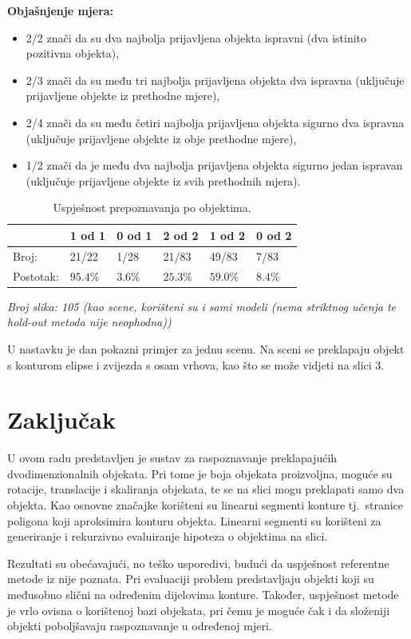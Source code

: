 \documentclass[lmodern, utf8, seminar, numeric]{fer}
\begin{document}
\textbf{Objašnjenje mjera:}
\begin{itemize}
    \item 2/2 znači da su dva najbolja prijavljena objekta ispravni (dva istinito pozitivna objekta),
    \item 2/3 znači da su među tri najbolja prijavljena objekta dva ispravna (uključuje prijavljene objekte iz prethodne mjere),
    \item 2/4 znači da su među četiri najbolja prijavljena objekta sigurno dva ispravna (uključuje prijavljene objekte iz obje prethodne mjere),
    \item 1/2 znači da je među dva najbolja prijavljena objekta sigurno jedan ispravan (uključuje prijavljene objekte iz svih prethodnih mjera).
\end{itemize}

\begin{table}[htb]
\centering
\caption{Uspješnost prepoznavanja po objektima.}
\label{tbl:po-obj}
\begin{tabular}{l l l l l l}
\toprule
 & 1 od 1 & 0 od 1 & 2 od 2 & 1 od 2 & 0 od 2\\
\midrule
Broj: & 21/22 & 1/28 & 21/83 & 49/83 & 7/83\\
Postotak: & $95.4\%$ & $3.6\%$ & $25.3\%$ & $59.0\%$ & $8.4\%$\\
\bottomrule
\end{tabular}
\end{table}
\emph{Broj slika: 105 (kao scene, korišteni su i sami modeli (nema striktnog učenja te hold-out metoda nije neophodna))}

U nastavku je dan pokazni primjer za jednu scenu. Na sceni se preklapaju objekt s konturom elipse i zvijezda s osam vrhova, kao što se može vidjeti na slici 3.

\chapter{Zaključak}
U ovom radu predstavljen je sustav za raspoznavanje preklapajućih dvodimenzionalnih objekata. Pri tome je boja objekata proizvoljna, moguće su rotacije, translacije i skaliranja objekata, te se na slici mogu preklapati samo dva objekta. Kao osnovne značajke korišteni su linearni segmenti konture tj.\ stranice poligona koji aproksimira konturu objekta. Linearni segmenti su korišteni za generiranje i rekurzivno evaluiranje hipoteza o objektima na slici.

Rezultati su obećavajući, no teško usporedivi, budući da uspješnost referentne metode iz \citep{ayache2009hyper} nije poznata. Pri evaluaciji problem predstavljaju objekti koji su međusobno slični na određenim dijelovima konture. Također, uspješnost metode je vrlo ovisna o korištenoj bazi objekata, pri čemu je moguće čak i da složeniji objekti poboljšavaju raspoznavanje u određenoj mjeri.
\end{document}
